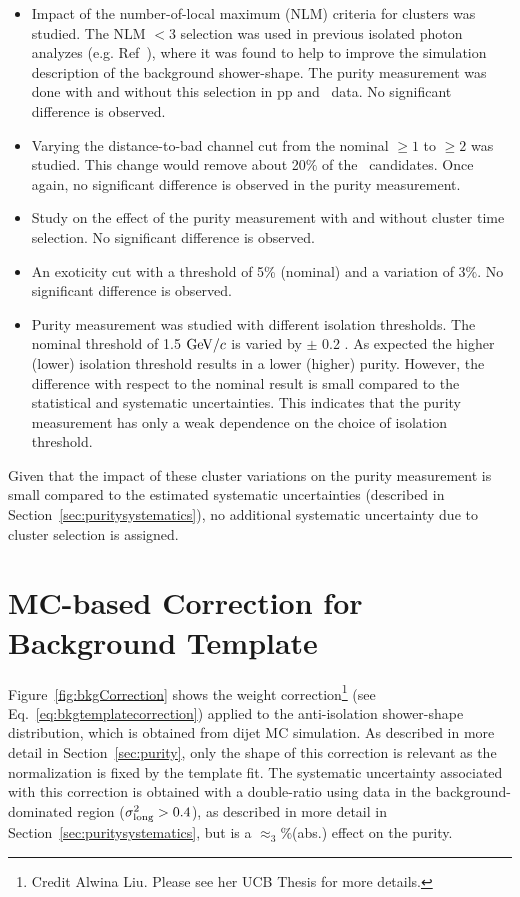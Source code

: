   \begin{itemize}
    \item Impact of the number-of-local maximum (NLM) criteria for clusters was studied. The NLM $<3$ selection was used in previous isolated photon analyzes (e.g. Ref~\cite{Acharya:2019jkx,Erwann}), where it was found to help to improve the simulation description of the background shower-shape. The purity measurement was done with and without this selection in pp and \pPb~data. No significant difference is observed.

    \item Varying the distance-to-bad channel cut from the nominal $\geq 1$ to $\geq 2$ was studied. This change would remove about 20$\%$ of the \gammaiso~candidates. Once again, no significant difference is observed in the purity measurement. 

    \item Study on the effect of the purity measurement with and without cluster time selection. No significant difference is observed. 

    \item An exoticity cut with a threshold of 5\% (nominal) and a variation of $3\%$. No significant difference is observed. 

    \item Purity measurement was studied with different isolation thresholds. The nominal threshold of 1.5 $\mathrm{GeV}/c$ is varied by $\pm$ 0.2 \GeVc. As expected the higher (lower) isolation threshold results in a lower (higher) purity. However, the difference with respect to the nominal result is small compared to the statistical and systematic uncertainties. This indicates that the purity measurement has only a weak dependence on the choice of isolation threshold. 
  \end{itemize}

Given that the impact of these cluster variations on the purity measurement is small compared to the estimated systematic uncertainties (described in Section~\ref{sec:puritysystematics}), no additional systematic uncertainty due to cluster selection is assigned. 

\section{MC-based Correction for Background Template}
\label{sec:MCbasedcorrection}

Figure~\ref{fig:bkgCorrection} shows the weight correction\footnote{Credit Alwina Liu. Please see her UCB Thesis for more details.} (see Eq.~\ref{eq:bkgtemplatecorrection}) applied to the anti-isolation shower-shape distribution, which is obtained from dijet MC simulation. As described in more detail in Section~\ref{sec:purity}, only the shape of this correction is relevant as the normalization is fixed by the template fit. The systematic uncertainty associated with this correction is obtained with a double-ratio using data in the background-dominated region ($\sigma^{2}_{\mathrm{long}}>0.4$), as described in more detail in Section~\ref{sec:puritysystematics}, but is a $\approx_3\%$(abs.) effect on the purity. 

